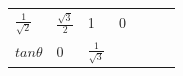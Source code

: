 {\begin{tabular}[t]{|l|l|l|l|l|l|l|}
                \begin{math}\frac{1}{\sqrt{2}}\end{math}
               &
    
    
        
                \begin{math}\frac{\sqrt{3}}{2}\end{math}
               &
    
    
        1 &
    
    
        0%
     \tabularnewline\cline{1-1}\cline{2-2}\cline{3-3}\cline{4-4}\cline{5-5}\cline{6-6}\cline{7-7}
    
    
        
                \begin{math}tan\theta \end{math}
               &
    
    
        0 &
    
    
        
                \begin{math}\frac{1}{\sqrt{3}}\end{math}
               &
    

\end{tabular}}
